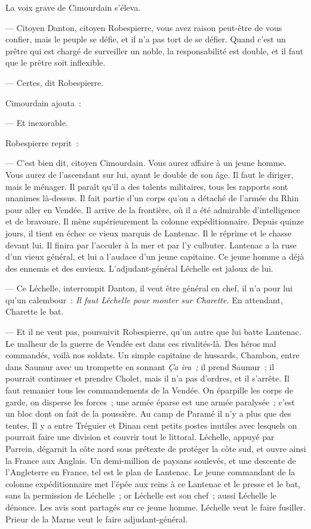 \documentclass[french,twoside]{book} %
\begin{document}
La voix grave de Cimourdain s’éleva.\par
— Citoyen Danton, citoyen Robespierre, vous avez raison peut-être de vous confier, mais le peuple se défie, et il n’a pas tort de se défier. Quand c’est un prêtre qui est chargé de surveiller un noble, la responsabilité est double, et il faut que le prêtre soit inflexible.\par
— Certes, dit Robespierre.\par
Cimourdain ajouta :\par
— Et inexorable.\par
Robespierre reprit :\par
— C’est bien dit, citoyen Cimourdain. Vous aurez affaire à un jeune homme. Vous aurez de l’ascendant sur lui, ayant le double de son âge. Il faut le diriger, mais le ménager. Il paraît qu’il a des talents militaires, tous les rapports sont unanimes là-dessus. Il  fait partie d’un corps qu’on a détaché de l’armée du Rhin pour aller en Vendée. Il arrive de la frontière, où il a été admirable d’intelligence et de bravoure. Il mène supérieurement la colonne expéditionnaire. Depuis quinze jours, il tient en échec ce vieux marquis de Lantenac. Il le réprime et le chasse devant lui. Il finira par l’acculer à la mer et par l’y culbuter. Lantenac a la ruse d’un vieux général, et lui a l’audace d’un jeune capitaine. Ce jeune homme a déjà des ennemis et des envieux. L’adjudant-général Léchelle est jaloux de lui.\par
— Ce Léchelle, interrompit Danton, il veut être général en chef, il n’a pour lui qu’un calembour : \emph{Il faut Léchelle pour monter sur Charette.} En attendant, Charette le bat.\par
— Et il ne veut pas, poursuivit Robespierre, qu’un autre que lui batte Lantenac. Le malheur de la guerre de Vendée est dans ces rivalités-là. Des héros mal commandés, voilà nos soldats. Un simple capitaine de hussards, Chambon, entre dans Saumur avec un trompette en sonnant \emph{Ça ira ;} il prend Saumur ; il pourrait continuer et prendre Cholet, mais il n’a pas d’ordres, et il s’arrête. Il faut remanier tous les commandements de la Vendée. On éparpille les corps de garde, on disperse les forces ; une armée éparse est une armée paralysée ; c’est un bloc dont on fait de la poussière. Au camp de Paramé il n’y a plus que des tentes. Il y a entre Tréguier et Dinan cent petits postes inutiles avec lesquels on pourrait faire une division et couvrir tout le littoral. Léchelle, appuyé  par Parrein, dégarnit la côte nord sous prétexte de protéger la côte sud, et ouvre ainsi la France aux Anglais. Un demi-million de paysans soulevés, et une descente de l’Angleterre en France, tel est le plan de Lantenac. Le jeune commandant de la colonne expéditionnaire met l’épée aux reins à ce Lantenac et le presse et le bat, sans la permission de Léchelle ; or Léchelle est son chef ; aussi Léchelle le dénonce. Les avis sont partagés sur ce jeune homme. Léchelle veut le faire fusiller. Prieur de la Marne veut le faire adjudant-général.\par
\end{document}
